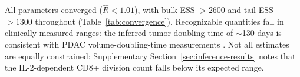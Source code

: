 All parameters converged ($\hat{R} < 1.01$), with bulk-ESS $> 2600$ and tail-ESS $> 1300$ throughout (Table~\ref{tab:convergence}). Recognizable quantities fall in clinically measured ranges: the inferred tumor doubling time of $\sim$130 days is consistent with PDAC volume-doubling-time measurements \citep{ahnTimeProgressionPancreatic2017, jangMissedPancreaticDuctal2015}. Not all estimates are equally constrained: Supplementary Section~\ref{sec:inference-results} notes that the IL-2-dependent CD8+ division count falls below its expected range.
